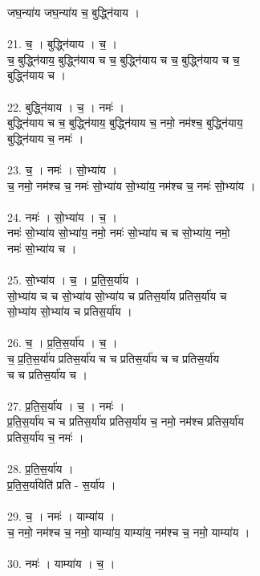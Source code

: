 जघ॒न्या॑य जघ॒न्या॑य च॒ बुद्ध्नि॑याय ।\\
\\
21. च॒ । बुद्ध्नि॑याय । च॒ ।\\
च॒ बुद्ध्नि॑याय॒ बुद्ध्नि॑याय च च॒ बुद्ध्नि॑याय च च॒ बुद्ध्नि॑याय च च॒\\
बुद्ध्नि॑याय च ।\\
\\
22. बुद्ध्नि॑याय । च॒ । नमः॑ ।\\
बुद्ध्नि॑याय च च॒ बुद्ध्नि॑याय॒ बुद्ध्नि॑याय च॒ नमो॒ नम॑श्च॒ बुद्ध्नि॑याय॒\\
बुद्ध्नि॑याय च॒ नमः॑ ।\\
\\
23. च॒ । नमः॑ । सो॒भ्या॑य ।\\
च॒ नमो॒ नम॑श्च च॒ नमः॑ सो॒भ्या॑य सो॒भ्या॑य॒ नम॑श्च च॒ नमः॑ सो॒भ्या॑य ।\\
\\
24. नमः॑ । सो॒भ्या॑य । च॒ ।\\
नमः॑ सो॒भ्या॑य सो॒भ्या॑य॒ नमो॒ नमः॑ सो॒भ्या॑य च च सो॒भ्या॑य॒ नमो॒\\
नमः॑ सो॒भ्या॑य च ।\\
\\
25. सो॒भ्या॑य । च॒ । प्र॒ति॒स॒र्या॑य ।\\
सो॒भ्या॑य च च सो॒भ्या॑य सो॒भ्या॑य च प्रतिस॒र्या॑य प्रतिस॒र्या॑य च\\
सो॒भ्या॑य सो॒भ्या॑य च प्रतिस॒र्या॑य ।\\
\\
26. च॒ । प्र॒ति॒स॒र्या॑य । च॒ ।\\
च॒ प्र॒ति॒स॒र्या॑य प्रतिस॒र्या॑य च च प्रतिस॒र्या॑य च च प्रतिस॒र्या॑य\\
च च प्रतिस॒र्या॑य च ।\\
\\
27. प्र॒ति॒स॒र्या॑य । च॒ । नमः॑ ।\\
प्र॒ति॒स॒र्या॑य च च प्रतिस॒र्या॑य प्रतिस॒र्या॑य च॒ नमो॒ नम॑श्च प्रतिस॒र्या॑य\\
प्रतिस॒र्या॑य च॒ नमः॑ ।\\
\\
28. प्र॒ति॒स॒र्या॑य ।\\
प्र॒ति॒स॒र्या॑येति॑ प्रति - स॒र्या॑य ।\\
\\
29. च॒ । नमः॑ । याम्या॑य ।\\
च॒ नमो॒ नम॑श्च च॒ नमो॒ याम्या॑य॒ याम्या॑य॒ नम॑श्च च॒ नमो॒ याम्या॑य ।\\
\\
30. नमः॑ । याम्या॑य । च॒ ।\\
